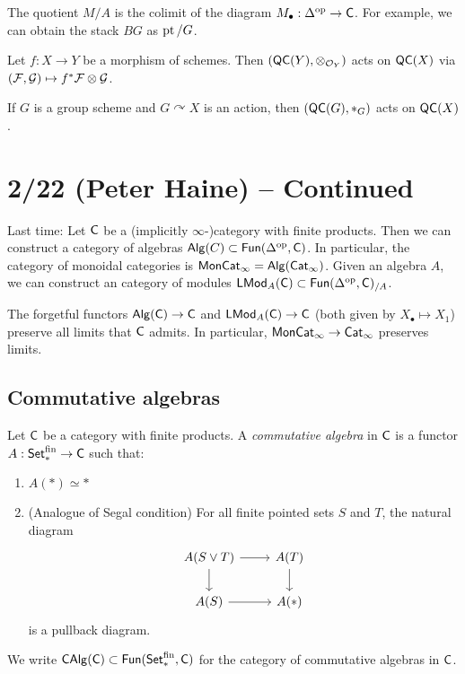 \documentclass{article}
\begin{document}
The quotient $M / A$ is the colimit of the diagram $M_\bullet: \Delta^{\mathrm{op}} \to \mathsf{C}$.
For example, we can obtain the stack $BG$ as $\operatorname{pt} / G$.

\begin{ex}
	Let $f: X \to Y$ be a morphism of schemes.
	Then $(\mathsf{QC}(Y), \otimes_{\mathcal{O}_Y})$ acts on $\mathsf{QC}(X)$ via $(\mathcal{F}, \mathcal{G}) \mapsto f^* \mathcal{F} \otimes \mathcal{G}$.
\end{ex}

\begin{ex}
	If $G$ is a group scheme and $G \curvearrowright X$ is an action, then $(\mathsf{QC}(G), *_G)$ acts on $\mathsf{QC}(X)$.
\end{ex}

\section{2/22 (Peter Haine) -- Continued}

Last time: Let $\mathsf{C}$ be a (implicitly $\infty$-)category with finite products.
Then we can construct a category of algebras $\mathsf{Alg}(C) \subset \mathsf{Fun}(\Delta^{\mathrm{op}}, \mathsf{C})$.
In particular, the category of monoidal categories is $\mathsf{MonCat}_\infty = \mathsf{Alg}(\mathsf{Cat}_\infty)$.
Given an algebra $A$, we can construct an category of modules $\mathsf{LMod}_A(\mathsf{C}) \subset \mathsf{Fun}(\Delta^{\mathrm{op}}, \mathsf{C})_{/A}$.

The forgetful functors $\mathsf{Alg}(\mathsf{C}) \to \mathsf{C}$ and $\mathsf{LMod}_A(\mathsf{C}) \to \mathsf{C}$ (both given by $X_\bullet \mapsto X_1$) preserve all limits that $\mathsf{C}$ admits.
In particular, $\mathsf{MonCat}_\infty \to \mathsf{Cat}_\infty$ preserves limits.

\subsection{Commutative algebras}

\begin{dfn}
	Let $\mathsf{C}$ be a category with finite products.
	A \emph{commutative algebra} in $\mathsf{C}$ is a functor $A: \mathsf{Set}_*^{\mathrm{fin}} \to \mathsf{C}$ such that:
	\begin{enumerate}
		\item $A(*) \simeq *$
		\item (Analogue of Segal condition) For all finite pointed sets $S$ and $T$, the natural diagram
			\[
				\begin{tikzcd}
					A(S \vee T) \rar \dar & A(T) \dar \\
					A(S) \rar & A(*)
				\end{tikzcd}
			\]
			is a pullback diagram.
	\end{enumerate}
	We write $\mathsf{CAlg}(\mathsf{C}) \subset \mathsf{Fun}(\mathsf{Set}_*^{\mathrm{fin}}, \mathsf{C})$ for the category of commutative algebras in $\mathsf{C}$.
\end{dfn}
\end{document}
